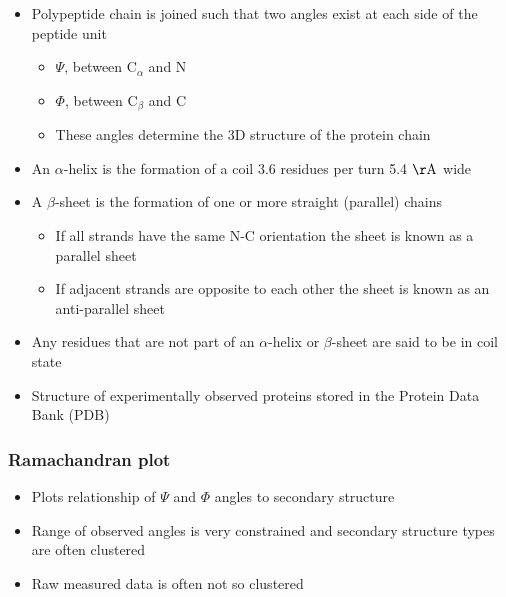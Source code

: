 \documentclass[a4paper]{article}
\begin{document}
\begin{itemize}
  \item
    Polypeptide chain is joined such that two angles exist at each side of the
    peptide unit

    \begin{itemize}
      \item
        $\Psi$, between $\mathrm{C}_{\alpha}$ and $\mathrm{N}$

      \item
        $\Phi$, between $\mathrm{C}_{\beta}$ and $\mathrm{C}$

      \item
        These angles determine the 3D structure of the protein chain
    \end{itemize}

  \item
    An $\alpha$-helix is the formation of a coil 3.6 residues per turn 5.4
    $\mathrm{\AA}$ wide

  \item
    A $\beta$-sheet is the formation of one or more straight (parallel) chains

    \begin{itemize}
      \item
        If all strands have the same N-C orientation the sheet is known as a
        parallel sheet

      \item
        If adjacent strands are opposite to each other the sheet is known as an
        anti-parallel sheet
    \end{itemize}

  \item
    Any residues that are not part of an $\alpha$-helix or $\beta$-sheet are
    said to be in coil state

  \item
    Structure of experimentally observed proteins stored in the Protein Data
    Bank (PDB)
\end{itemize}

\subsubsection{Ramachandran plot}

\begin{itemize}
  \item
    Plots relationship of $\Psi$ and $\Phi$ angles to secondary structure

  \item
    Range of observed angles is very constrained and secondary structure types
    are often clustered

  \item
    Raw measured data is often not so clustered
\end{itemize}
\end{document}
